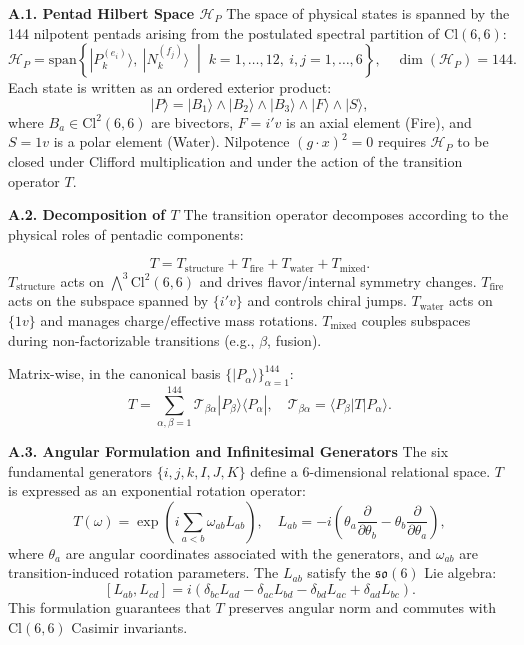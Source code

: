 \documentclass[11pt]{article}
\let\oldmathcal\mathcal
\renewcommand{\mathcal}[1]{\oldmathcal{#1}}
\begin{document}
\textbf{A.1. Pentad Hilbert Space \(\mathcal{H}_P\)} The space of
physical states is spanned by the 144 nilpotent pentads arising from the
postulated spectral partition of \(\text{Cl}(6,6)\): \[
\mathcal{H}_P = \text{span}\left\{ |P_k^{(e_i)}\rangle,\ |N_k^{(f_j)}\rangle \;\middle|\; k=1,\dots,12,\ i,j=1,\dots,6 \right\}, \quad \dim(\mathcal{H}_P)=144.
\] Each state is written as an ordered exterior product: \[
|P\rangle = |B_1\rangle \wedge |B_2\rangle \wedge |B_3\rangle \wedge |F\rangle \wedge |S\rangle,
\] where \(B_a \in \text{Cl}^2(6,6)\) are bivectors, \(F=i'v\) is an
axial element (Fire), and \(S=1v\) is a polar element (Water).
Nilpotence \((g\cdot x)^2=0\) requires \(\mathcal{H}_P\) to be closed
under Clifford multiplication and under the action of the transition
operator \(T\).

\textbf{A.2. Decomposition of \(T\)} The transition operator decomposes
according to the physical roles of pentadic components:

\[
T = T_{\text{structure}} + T_{\text{fire}} + T_{\text{water}} + T_{\text{mixed}}.
\] \(T_{\text{structure}}\) acts on \(\bigwedge^3 \text{Cl}^2(6,6)\) and
drives flavor/internal symmetry changes. \(T_{\text{fire}}\) acts on the
subspace spanned by \(\{i'v\}\) and controls chiral jumps.
\(T_{\text{water}}\) acts on \(\{1v\}\) and manages charge/effective
mass rotations. \(T_{\text{mixed}}\) couples subspaces during
non-factorizable transitions (e.g., \(\beta\), fusion).

Matrix-wise, in the canonical basis
\(\{|P_\alpha\rangle\}_{\alpha=1}^{144}\): \[
T = \sum_{\alpha,\beta=1}^{144} \mathcal{T}_{\beta\alpha} |P_\beta\rangle\langle P_\alpha|, \quad \mathcal{T}_{\beta\alpha} = \langle P_\beta | T | P_\alpha \rangle.
\]

\textbf{A.3. Angular Formulation and Infinitesimal Generators} The six
fundamental generators \(\{i,j,k,I,J,K\}\) define a 6-dimensional
relational space. \(T\) is expressed as an exponential rotation
operator: \[
T(\omega) = \exp\left( i \sum_{a<b} \omega_{ab} L_{ab} \right), \quad L_{ab} = -i\left( \theta_a \frac{\partial}{\partial \theta_b} - \theta_b \frac{\partial}{\partial \theta_a} \right),
\] where \(\theta_a\) are angular coordinates associated with the
generators, and \(\omega_{ab}\) are transition-induced rotation
parameters. The \(L_{ab}\) satisfy the \(\mathfrak{so}(6)\) Lie algebra:
\[
[L_{ab}, L_{cd}] = i(\delta_{bc}L_{ad} - \delta_{ac}L_{bd} - \delta_{bd}L_{ac} + \delta_{ad}L_{bc}).
\] This formulation guarantees that \(T\) preserves angular norm and
commutes with \(\text{Cl}(6,6)\) Casimir invariants.
\end{document}
